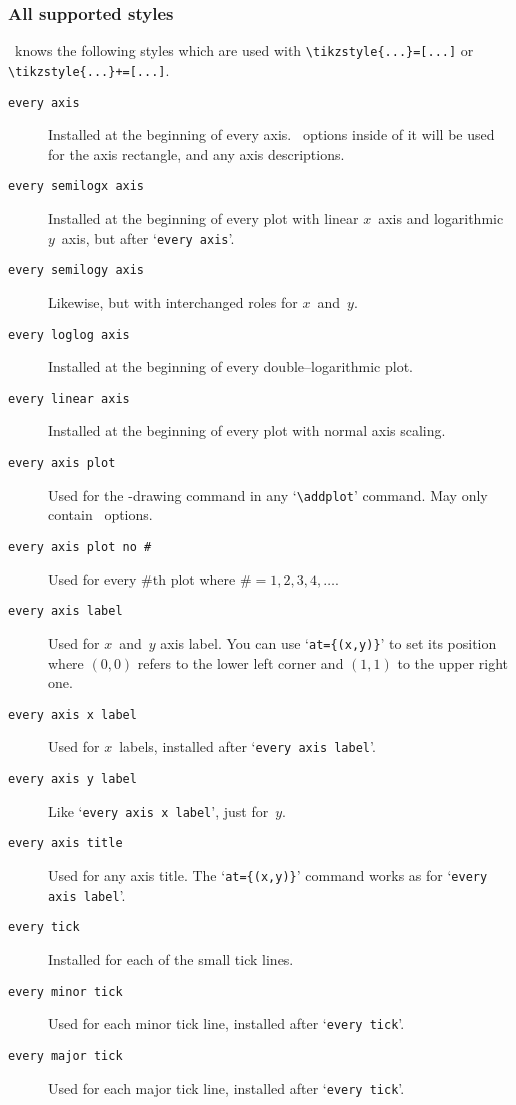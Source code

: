 \subsubsection{All supported styles}
\PGFPlots\ knows the following styles which are used with \lstinline!\tikzstyle{...}=[...]! or \lstinline!\tikzstyle{...}+=[...]!.
\label{sec:styles}%
\begin{description}
\item[\texttt{every axis}] Installed at the beginning of every axis. \Tikz\ options inside of it will be used for the axis rectangle, and any axis descriptions.
\item[\texttt{every semilogx axis}] Installed at the beginning of every plot with linear $x$~axis and logarithmic $y$~axis, but after `\texttt{every axis}'.
\item[\texttt{every semilogy axis}] Likewise, but with interchanged roles for $x$~and~$y$.
\item[\texttt{every loglog axis}] Installed at the beginning of every double--logarithmic plot.
\item[\texttt{every linear axis}] Installed at the beginning of every plot with normal axis scaling.
\item[\texttt{every axis plot}] Used for the \Tikz-drawing command in any `\lstinline!\addplot!' command. May only contain \Tikz\ options.
\item[\texttt{every axis plot no \#}] Used for every \#th plot where $\#=1,2,3,4,\dotsc$.
\item[\texttt{every axis label}] Used for $x$~and~$y$ axis label. You can use `\texttt{at=\{(x,y)\}}' to set its position where $(0,0)$ refers to the lower left corner and $(1,1)$ to the upper right one.
\item[\texttt{every axis x label}] Used for $x$~labels, installed after `\texttt{every axis label}'.
\item[\texttt{every axis y label}] Like `\texttt{every axis x label}', just for~$y$.
\item[\texttt{every axis title}] Used for any axis title. The `\texttt{at=\{(x,y)\}}' command works as for `\texttt{every axis label}'.
\item[\texttt{every tick}] Installed for each of the small tick lines.
\item[\texttt{every minor tick}] Used for each minor tick line, installed after `\texttt{every tick}'.
\item[\texttt{every major tick}] Used for each major tick line, installed after `\texttt{every tick}'.

\end{description}
